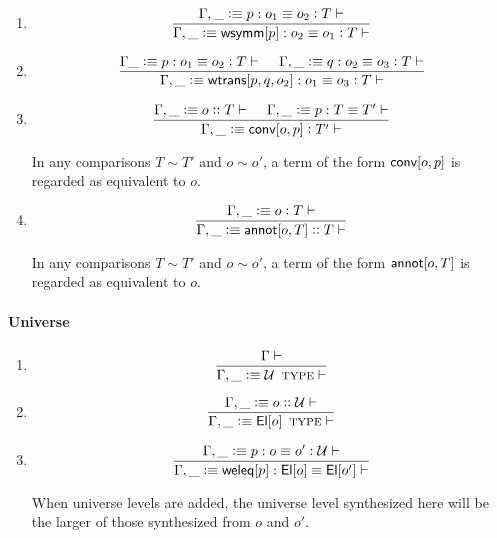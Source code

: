 \documentclass[11pt]{article}
\newcommand{\eqd}{\equiv}
\newcommand{\Eu}{{\cal U}}
\newcommand{\spc}{{\,\,\,\,\,\,\,}}
\newcommand{\ccolon}[1]{\vcentcolon#1}
\newcommand{\ccheck}[1]{\vcentcolon#1}  %
\newcommand{\csynth}[1]{\vcentcolon\vcentcolon #1} %
\newcommand{\Type}{\mathop{\text{ \sc type}}}
\newcommand{\Okay}{\mathop{\text{ \sc okay}}}
\newcommand{\Context}{\vdash\Okay}
\renewcommand{\Context}{\vdash}
\newcommand{\ha}[2]{#1[#2]}
\newcommand{\El}{{\sf El}}
\newcommand{\annot}{{\sf annot}}
\newcommand{\haa}[2]{\ha\annot{#1,#2}}
\newcommand{\conv}{{\sf conv}}
\newcommand{\weleq}{{\sf weleq}}
\newcommand{\wsymm}{{\sf wsymm}}
\newcommand{\wtrans}{{\sf wtrans}}
\newcommand{\var}{\char`_}
\newcommand{\defn}{\vcentcolon\equiv}
\begin{document}
\begin{enumerate}
\item 
\[\frac
    {\Gamma, \var \defn p:o_1\eqd o_2 \ccolon{T} \Context}
    {\Gamma, \var \defn \ha\wsymm{p}:o_2\eqd o_1 \ccolon{T} \Context}\]

\item 
\[\frac{\Gamma \var\defn p:o_1\eqd o_2 \ccolon{T} \Context 
  \spc
  \Gamma, \var\defn q:o_2\eqd o_3 \ccolon{T} \Context
  } {
  \Gamma, \var \defn \ha\wtrans{p,q,o_2}:o_1\eqd o_3 \ccolon{T} \Context}
\]

\item 
\[\frac
    { \Gamma, \var \defn o \csynth{T} \Context \spc \Gamma, \var \defn p : T \eqd T' \Context }
    { \Gamma, \var \defn \ha\conv{o,p} \ccheck{T'} \Context}\]

In any comparisons $T\sim T'$ and $o\sim o'$, a term of the form
$\ha\conv{o,p}$ is regarded as equivalent to $o$.

\item 
\[\frac{\Gamma, \var\defn o \ccheck{T} \Context}{\Gamma, \var\defn \haa o T \csynth{T}\Context}\]

In any comparisons $T\sim T'$ and $o\sim o'$, a term of the form
$\haa o T$ is regarded as equivalent to $o$.

\end{enumerate}

\paragraph{Universe}

\begin{enumerate}

\item

\[\frac{\Gamma\Context}{\Gamma, \var \defn \Eu \Type \Context }\]

\item

\[\frac{\Gamma, \var \defn o \csynth{\Eu} \Context}{\Gamma, \var \defn \ha\El{o}\Type \Context }\]


\item 

\[\frac{\Gamma, \var \defn p : o \eqd o' \ccheck{\Eu} \Context}
       {\Gamma, \var \defn \ha\weleq{p} : \ha\El{o} \eqd \ha\El{o'} \Context}\]

When universe levels are added, the universe level synthesized here will be the
larger of those synthesized from $o$ and $o'$.

\end{enumerate}
\end{document}

